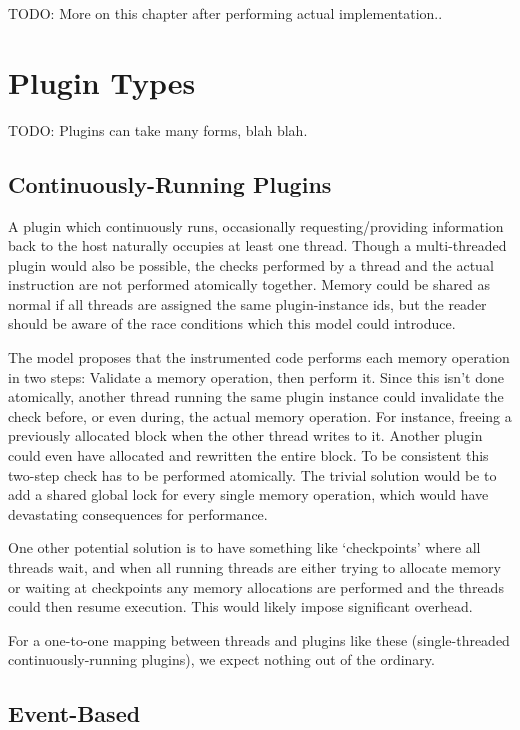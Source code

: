 TODO: More on this chapter after performing actual implementation..

\section {Plugin Types}

TODO: Plugins can take many forms, blah blah.

\subsection {Continuously-Running Plugins}

A plugin which continuously runs, occasionally requesting/providing information
back to the host naturally occupies at least one thread.
Though a multi-threaded plugin would also be possible, the checks performed by
a thread and the actual instruction are not performed atomically together.
Memory could be shared as normal if all threads are assigned the same
plugin-instance ids, but the reader should be aware of the race conditions which
this model could introduce.

The model proposes that the instrumented code performs each memory operation in
two steps: Validate a memory operation, then perform it.
Since this isn't done atomically, another thread running the same plugin
instance could invalidate the check before, or even during, the actual memory
operation.
For instance, freeing a previously allocated block when the other thread writes
to it.
Another plugin could even have allocated and rewritten the entire block.
To be consistent this two-step check has to be performed atomically.
The trivial solution would be to add a shared global lock for every single
memory operation, which would have devastating consequences for performance.

One other potential solution is to have something like `checkpoints' where all
threads wait, and when all running threads are either trying to allocate memory
or waiting at checkpoints any memory allocations are performed and the threads
could then resume execution.
This would likely impose significant overhead.

For a one-to-one mapping between threads and plugins like these (single-threaded
continuously-running plugins), we expect nothing out of the ordinary.

\subsection {Event-Based}

